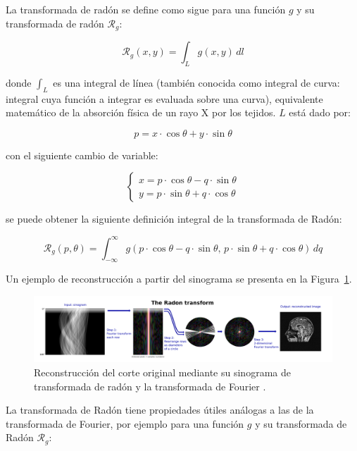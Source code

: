 La transformada de radón se define como sigue para una función $g$ y su transformada de radón $\mathcal{R}_g$:

\begin{equation}
\mathcal{R}_g(x,y) = \int_{L} g(x,y) \, dl 
\end{equation}

donde $\int_{L}$ es una integral de línea (también conocida como integral de curva: integral cuya función a integrar es evaluada sobre una curva), equivalente matemático de la absorción física de un rayo X por los tejidos. $L$ está dado por:

\begin{equation}
p = x \cdot \cos \theta + y \cdot \sin \theta 
\end{equation}

con el siguiente cambio de variable: 

\[
\begin{cases}
x = p \cdot \cos \theta - q \cdot \sin \theta \\[6pt]
y = p \cdot \sin \theta + q \cdot \cos \theta
\end{cases}
\]


se puede obtener la siguiente definición integral de la transformada de Radón:

\begin{equation}
\mathcal{R}_g(p,\theta) = \int_{-\infty}^{\infty} g(p \cdot \cos \theta - q \cdot \sin \theta, \, p \cdot \sin \theta + q \cdot \cos \theta) \, dq 
\end{equation}

Un ejemplo de reconstrucción a partir del sinograma se presenta en la Figura~\ref{fig:transformada-radon}.

\begin{figure}[!htbp]
    \centering
    \includegraphics[width=1\textwidth]{img/transformada_radon.png}
    \caption{Reconstrucción del corte original mediante su sinograma de transformada de radón y la transformada de Fourier \parencite{wikipediaRadon}.}
    \label{fig:transformada-radon}
\end{figure}

La transformada de Radón tiene propiedades útiles análogas a las de la transformada de Fourier, por ejemplo para una función $g$ y su transformada de Radón $\mathcal{R}_g$:

